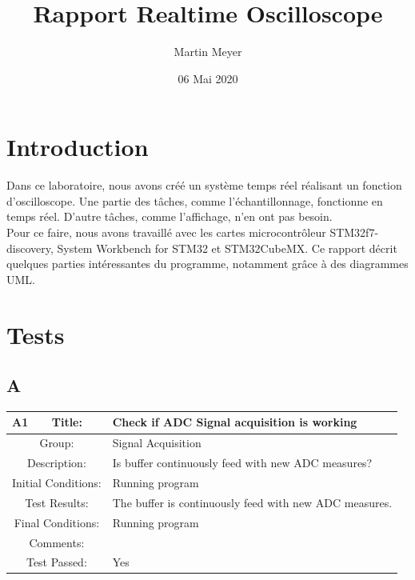 \documentclass[12pt]{article}
\title{Rapport Realtime Oscilloscope}
\author{Martin Meyer}
\date{06 Mai 2020}
\begin{document}
	\maketitle
	
	\tableofcontents

	\section{Introduction}
	Dans ce laboratoire, nous avons créé un système temps réel réalisant un fonction d'oscilloscope. Une partie des tâches, comme l'échantillonnage, fonctionne en temps réel. D'autre tâches, comme l'affichage, n'en ont pas besoin.\\
	Pour ce faire, nous avons travaillé avec les cartes microcontrôleur STM32f7-discovery, System Workbench for STM32 et STM32CubeMX.\newline
	Ce rapport décrit quelques parties intéressantes du programme, notamment grâce à des diagrammes UML.
	\section{Tests}
	\subsection{A}
		\begin{table}[H]
			\begin{center}
				\begin{tabular}{| m{2cm}|m{2cm}|m{12cm}|}
					\hline 
					\bf A1&\bf Title:&\bf Check if ADC Signal acquisition is working\\ 
					\hline 
					\multicolumn{2}{|c|}{Group:}&Signal Acquisition\\ 
					\hline 
					\multicolumn{2}{|c|}{Description:}&Is buffer continuously feed with new ADC measures?
					\\ 
					\hline 
					\multicolumn{2}{|c|}{Initial Conditions:}&Running program\\ 
					\hline 
					\multicolumn{2}{|c|}{Test Results:}&The buffer is continuously feed with new ADC measures.\\ 
					\hline 
					\multicolumn{2}{|c|}{Final Conditions:}&Running program\\ 
					\hline 
					\multicolumn{2}{|c|}{Comments:}&\\ 
					\hline 
					\multicolumn{2}{|c|}{Test Passed:}&Yes\\ 
					\hline 
				\end{tabular} 
			\end{center}
		\end{table}
	
\end{document}
